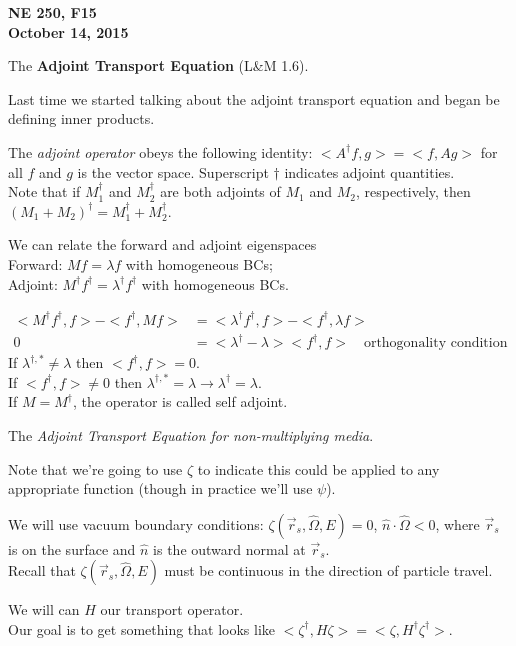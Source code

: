 \documentclass[12pt]{article}
\newcommand{\vOmega}{\ensuremath{\hat{\Omega}}}
\begin{document}
\begin{center}
{\bf NE 250, F15\\
October 14, 2015 
}
\end{center}

The \textbf{Adjoint Transport Equation} (L\&M 1.6).

Last time we started talking about the adjoint transport equation and began be defining inner products. 

The \textit{adjoint operator} obeys the following identity: $<A^{\dagger}f, g> = <f, Ag>$ for all $f$ and $g$ is the vector space. Superscript $\dagger$ indicates adjoint quantities.\\
Note that if $M_1^{\dagger}$ and $M_2^{\dagger}$ are both adjoints of $M_1$ and $M_2$, respectively, then $(M_1 + M_2)^{\dagger}  = M_1^{\dagger} + M_2^{\dagger}$.

We can relate the forward and adjoint eigenspaces\\
Forward: $Mf = \lambda f$ with homogeneous BCs;\\
Adjoint: $M^{\dagger}f^{\dagger} = \lambda^{\dagger} f^{\dagger}$ with homogeneous BCs.

\begin{align*}
<M^{\dagger}f^{\dagger}, f> - <f^{\dagger}, Mf> &= <\lambda^{\dagger} f^{\dagger}, f> - <f^{\dagger} ,\lambda f> \\
0 &= <\lambda^{\dagger} - \lambda> <f^{\dagger}, f> \quad \text{orthogonality condition}
\end{align*}
%
If $\lambda^{\dagger, *} \neq \lambda$ then $<f^{\dagger}, f> = 0$.\\
If $<f^{\dagger}, f> \neq 0$ then $\lambda^{\dagger, *} = \lambda \rightarrow \lambda^{\dagger} = \lambda$.\\
If $M = M^{\dagger}$, the operator is called self adjoint. 

The \textit{Adjoint Transport Equation for non-multiplying media}.

Note that we're going to use $\zeta$ to indicate this could be applied to any appropriate function (though in practice we'll use $\psi$).

We will use vacuum boundary conditions: $\zeta(\vec{r}_s, \vOmega, E) = 0$, $\hat{n} \cdot \vOmega < 0$, where $\vec{r}_s$ is on the surface and $\hat{n}$ is the outward normal at $\vec{r}_s$.\\
Recall that $\zeta(\vec{r}_s, \vOmega, E)$ must be continuous in the direction of particle travel.


We will can $H$ our transport operator.\\
Our goal is to get something that looks like $<\zeta^{\dagger}, H \zeta> = <\zeta, H^{\dagger} \zeta^{\dagger}>$.\\
\end{document}
